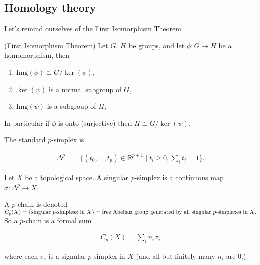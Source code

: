 \subsection{Homology theory}

Let's remind ourselves of the First Isomorphism Theorem
\begin{thm}
(First Isomorphism Theorem) Let $G$, $H$ be groups, and let $\phi:G\to H$
be a homomorphism, then\end{thm}
\begin{enumerate}
\item $\text{Img}(\phi)\cong G/\ker(\phi)$,
\item $\ker(\psi)$ is a normal subgroup of $G$,
\item $\text{Img}(\psi)$ is a subgroup of $H$,
\end{enumerate}
In particular if $\phi$ is onto (surjective) then $H\cong G/\ker(\psi)$.
\begin{defn}
The standard $p$-simplex is 

\begin{align*}
\Delta^{p} & =\{(t_{0},\dots,t_{p})\in\mathbb{R}^{p+1}\mid t_{i}\geqslant0,\sum_{i}t_{i}=1\}.
\end{align*}

\end{defn}

\begin{defn}
Let $X$ be a topological space. A singular $p$-simplex is a continuous
map $\sigma:\Delta^{p}\to X$.
\end{defn}

\begin{defn}
A $p$-chain is denoted $C_{p}(X)=\{\text{singular \ensuremath{p}-simplesx in \ensuremath{X}}\}=\text{free Abelian group generated by all singular \ensuremath{p}-simplexes in \ensuremath{X}.}$
So a $p$-chain is a formal sum

\begin{align*}
C_{p}(X)=\sum_{i}n_{i}\sigma_{i}
\end{align*}


where each $\sigma_{i}$ is a signular $p$-simplex in $X$ (and all
but finitely-many $n_{i}$ are $0$.)
\end{defn}

